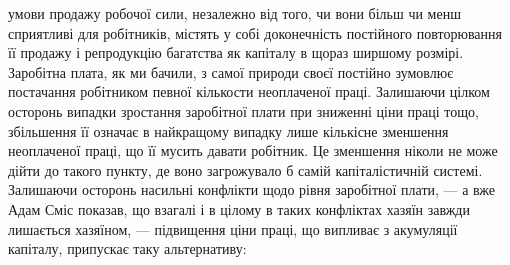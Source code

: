 умови продажу робочої сили, незалежно від того, чи вони більш
чи менш сприятливі для робітників, містять у собі доконечність
постійного повторювання її продажу і репродукцію багатства
як капіталу в щораз ширшому розмірі. Заробітна плата, як ми
бачили, з самої природи своєї постійно зумовлює постачання
робітником певної кількости неоплаченої праці. Залишаючи
цілком осторонь випадки зростання заробітної плати при зниженні
ціни праці тощо, збільшення її означає в найкращому
випадку лише кількісне зменшення неоплаченої праці, що її
мусить давати робітник. Це зменшення ніколи не може дійти до
такого пункту, де воно загрожувало б самій капіталістичній
системі. Залишаючи осторонь насильні конфлікти щодо рівня
заробітної плати, — а вже Адам Сміс показав, що взагалі і в цілому
в таких конфліктах хазяїн завжди лишається хазяїном, —
підвищення ціни праці, що випливає з акумуляції капіталу,
припускає таку альтернативу:

